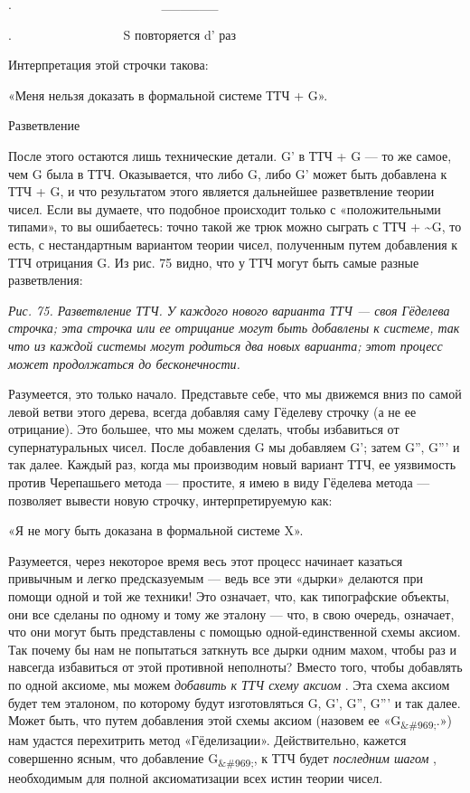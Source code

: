 .~~~~~~~~~~~~~~~~~~~~~~~ \textbar\_\_\_\_\_\_\textbar{}

.~~~~~~~~~~~~~~~~~ S повторяется d' раз

Интерпретация этой строчки такова:

«Меня нельзя доказать в формальной системе ТТЧ + G».

Разветвление

После этого остаются лишь технические детали. G' в ТТЧ + G --- то же самое, чем G была в ТТЧ. Оказывается, что либо G, либо G' может быть добавлена к ТТЧ + G, и что результатом этого является дальнейшее разветвление теории чисел. Если вы думаете, что подобное происходит только с «положительными типами», то вы ошибаетесь: точно такой же трюк можно сыграть с ТТЧ + \textasciitilde G, то есть, с нестандартным вариантом теории чисел, полученным путем добавления к ТТЧ отрицания G. Из рис. 75 видно, что у ТТЧ могут быть самые разные разветвления:

\emph{Рис. 75. Разветвление ТТЧ. У каждого нового варианта ТТЧ --- своя Гёделева строчка; эта строчка или ее отрицание могут быть добавлены к системе, так что из каждой системы могут родиться два новых варианта; этот процесс может продолжаться до бесконечности.}

Разумеется, это только начало. Представьте себе, что мы движемся вниз по самой левой ветви этого дерева, всегда добавляя саму Гёделеву строчку (а не ее отрицание). Это большее, что мы можем сделать, чтобы избавиться от супернатуральных чисел. После добавления G мы добавляем G'; затем G'', G''' и так далее. Каждый раз, когда мы производим новый вариант ТТЧ, ее уязвимость против Черепашьего метода --- простите, я имею в виду Гёделева метода --- позволяет вывести новую строчку, интерпретируемую как:

«Я не могу быть доказана в формальной системе X».

Разумеется, через некоторое время весь этот процесс начинает казаться привычным и легко предсказуемым --- ведь все эти «дырки» делаются при помощи одной и той же техники! Это означает, что, как типографские объекты, они все сделаны по одному и тому же эталону --- что, в свою очередь, означает, что они могут быть представлены с помощью одной-единственной схемы аксиом. Так почему бы нам не попытаться заткнуть все дырки одним махом, чтобы раз и навсегда избавиться от этой противной неполноты? Вместо того, чтобы добавлять по одной аксиоме, мы можем \emph{добавить к ТТЧ схему аксиом} . Эта схема аксиом будет тем эталоном, по которому будут изготовляться G, G', G'', G''' и так далее. Может быть, что путем добавления этой схемы аксиом (назовем ее «G\textsubscript{\&\#969;}.») нам удастся перехитрить метод «Гёделизации». Действительно, кажется совершенно ясным, что добавление G\textsubscript{\&\#969;}, к ТТЧ будет \emph{последним шагом} , необходимым для полной аксиоматизации всех истин теории чисел.

